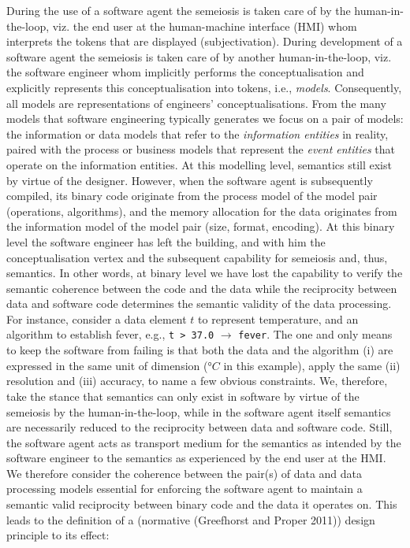 \documentclass[a4paper,11pt,oneside,oldfontcommands]{memoir}
\theoremstyle{definition}
\theoremstyle{break}		%
\numberwithin{equation}{chapter}
\numberwithin{figure}{chapter}
\begin{document}
During the use of a software agent the semeiosis is taken care of by the
human-in-the-loop, viz. the end user at the human-machine interface
(HMI) whom interprets the tokens that are displayed (subjectivation).
During development of a software agent the semeiosis is taken care of by
another human-in-the-loop, viz. the software engineer whom implicitly
performs the conceptualisation and explicitly represents this
conceptualisation into tokens, i.e., \emph{models}. Consequently, all
models are representations of engineers' conceptualisations. From the
many models that software engineering typically generates we focus on a
pair of models: the information or data models that refer to the
\emph{information entities} in reality, paired with the process or
business models that represent the \emph{event entities} that operate on
the information entities. At this modelling level, semantics still exist
by virtue of the designer. However, when the software agent is
subsequently compiled, its binary code originate from the process model
of the model pair (operations, algorithms), and the memory allocation
for the data originates from the information model of the model pair
(size, format, encoding). At this binary level the software engineer has
left the building, and with him the conceptualisation vertex and the
subsequent capability for semeiosis and, thus, semantics. In other
words, at binary level we have lost the capability to verify the
semantic coherence between the code and the data while the reciprocity
between data and software code determines the semantic validity of the
data processing. For instance, consider a data element \(t\) to
represent temperature, and an algorithm to establish fever, e.g.,
\texttt{t\ \textgreater{}\ 37.0} \(\to\) \texttt{fever}. The one and
only means to keep the software from failing is that both the data and
the algorithm (i) are expressed in the same unit of dimension
(\(\si{\degree}C\) in this example), apply the same (ii) resolution and
(iii) accuracy, to name a few obvious constraints. We, therefore, take
the stance that semantics can only exist in software by virtue of the
semeiosis by the human-in-the-loop, while in the software agent itself
semantics are necessarily reduced to the reciprocity between data and
software code. Still, the software agent acts as transport medium for
the semantics as intended by the software engineer to the semantics as
experienced by the end user at the HMI. We therefore consider the
coherence between the pair(s) of data and data processing models
essential for enforcing the software agent to maintain a semantic valid
reciprocity between binary code and the data it operates on. This leads
to the definition of a (normative (Greefhorst and Proper 2011)) design
principle to its effect:
\end{document}
